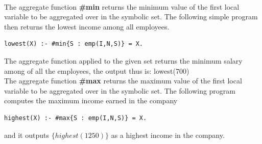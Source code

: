 \documentclass[14pt,a4paper, titlepage]{article}
\begin{document}
\bigskip \\The aggregate function \textbf{\#min} returns the minimum value of the first local variable to be aggregated over in the symbolic set. The following simple program then returns the lowest income among all employees.
\begin{lstlisting}
lowest(X) :- #min{S : emp(I,N,S)} = X.
\end{lstlisting}
The aggregate function applied to the given set returns the minimum salary among of all the employees, the output thus is:
{lowest(700)}
\bigskip \\ The aggregate function \textbf{\#max} returns the maximum value of the first local variable to be aggregated over in the symbolic set. The following program computes the maximum income earned in the company
\begin{lstlisting}
highest(X) :- #max{S : emp(I,N,S)} = X.
\end{lstlisting}
and it outputs $\{highest(1250)\}$ as a highest income in the company.
\end{document}
